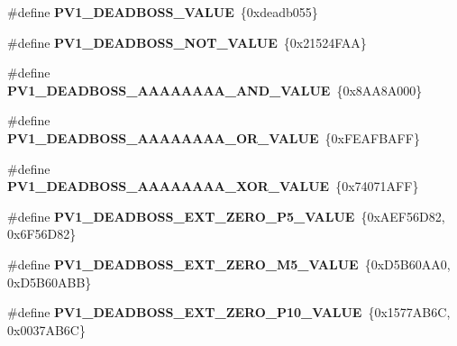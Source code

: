 \begin{DoxyCompactItemize}
\item 
\mbox{\label{unit-test-bit-vector_8c_a6b58503ed6317253b05296cda8ba25e8}} 
\#define {\bfseries P\+V1\+\_\+\+D\+E\+A\+D\+B\+O\+S\+S\+\_\+\+V\+A\+L\+UE}~\{0xdeadb055\}
\item 
\mbox{\label{unit-test-bit-vector_8c_a79b8064d37186610fa0b8e8d885177fd}} 
\#define {\bfseries P\+V1\+\_\+\+D\+E\+A\+D\+B\+O\+S\+S\+\_\+\+N\+O\+T\+\_\+\+V\+A\+L\+UE}~\{0x21524\+F\+A\+A\}
\item 
\mbox{\label{unit-test-bit-vector_8c_aea11da933492735b8e16f8f16baeff2e}} 
\#define {\bfseries P\+V1\+\_\+\+D\+E\+A\+D\+B\+O\+S\+S\+\_\+\+A\+A\+A\+A\+A\+A\+A\+A\+\_\+\+A\+N\+D\+\_\+\+V\+A\+L\+UE}~\{0x8\+A\+A8\+A000\}
\item 
\mbox{\label{unit-test-bit-vector_8c_abfe60d2fc21862514f8824591931bcfe}} 
\#define {\bfseries P\+V1\+\_\+\+D\+E\+A\+D\+B\+O\+S\+S\+\_\+\+A\+A\+A\+A\+A\+A\+A\+A\+\_\+\+O\+R\+\_\+\+V\+A\+L\+UE}~\{0x\+F\+E\+A\+F\+B\+A\+F\+F\}
\item 
\mbox{\label{unit-test-bit-vector_8c_a1479c7f052e45fcb16cc9b05d4356f02}} 
\#define {\bfseries P\+V1\+\_\+\+D\+E\+A\+D\+B\+O\+S\+S\+\_\+\+A\+A\+A\+A\+A\+A\+A\+A\+\_\+\+X\+O\+R\+\_\+\+V\+A\+L\+UE}~\{0x74071\+A\+F\+F\}
\item 
\mbox{\label{unit-test-bit-vector_8c_a96473330f486cb6de236936b2836c1b3}} 
\#define {\bfseries P\+V1\+\_\+\+D\+E\+A\+D\+B\+O\+S\+S\+\_\+\+E\+X\+T\+\_\+\+Z\+E\+R\+O\+\_\+\+P5\+\_\+\+V\+A\+L\+UE}~\{0x\+A\+E\+F56\+D82, 0x6\+F56\+D82\}
\item 
\mbox{\label{unit-test-bit-vector_8c_a841437db2e66bd6322c6f76a19d998fd}} 
\#define {\bfseries P\+V1\+\_\+\+D\+E\+A\+D\+B\+O\+S\+S\+\_\+\+E\+X\+T\+\_\+\+Z\+E\+R\+O\+\_\+\+M5\+\_\+\+V\+A\+L\+UE}~\{0x\+D5\+B60\+A\+A0, 0x\+D5\+B60\+A\+B\+B\}
\item 
\mbox{\label{unit-test-bit-vector_8c_af59292b444174680df0b68cdfe75f2b2}} 
\#define {\bfseries P\+V1\+\_\+\+D\+E\+A\+D\+B\+O\+S\+S\+\_\+\+E\+X\+T\+\_\+\+Z\+E\+R\+O\+\_\+\+P10\+\_\+\+V\+A\+L\+UE}~\{0x1577\+A\+B6\+C, 0x0037\+A\+B6\+C\}

\end{DoxyCompactItemize}
